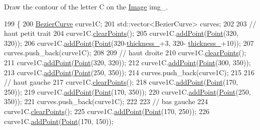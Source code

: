 Draw the contour of the letter C on the \mbox{\hyperlink{class_image}{Image}} img\+\_\+. 


\begin{DoxyCode}
199                \{
200     \mbox{\hyperlink{class_bezier_curve}{BezierCurve}} curve1C;
201     std::vector<BezierCurve> curves;
202 
203     \textcolor{comment}{// haut petit trait}
204     curve1C.\mbox{\hyperlink{class_bezier_curve_a0ba8ce66d5af5971ae6a1b506029728e}{clearPoints}}();
205     curve1C.\mbox{\hyperlink{class_bezier_curve_a38d16c18b36ae45619b05e26e226cf34}{addPoint}}(\mbox{\hyperlink{class_point}{Point}}(320, 320));
206     curve1C.\mbox{\hyperlink{class_bezier_curve_a38d16c18b36ae45619b05e26e226cf34}{addPoint}}(\mbox{\hyperlink{class_point}{Point}}(320-\mbox{\hyperlink{class_font_v1_aed8040e76be9a52833627b92f0fb4e5f}{thickness\_}}+3, 320-
      \mbox{\hyperlink{class_font_v1_aed8040e76be9a52833627b92f0fb4e5f}{thickness\_}}+10));
207     curves.push\_back(curve1C);
208     
209     \textcolor{comment}{// haut droite}
210     curve1C.\mbox{\hyperlink{class_bezier_curve_a0ba8ce66d5af5971ae6a1b506029728e}{clearPoints}}();
211     curve1C.\mbox{\hyperlink{class_bezier_curve_a38d16c18b36ae45619b05e26e226cf34}{addPoint}}(\mbox{\hyperlink{class_point}{Point}}(320, 320));
212     curve1C.\mbox{\hyperlink{class_bezier_curve_a38d16c18b36ae45619b05e26e226cf34}{addPoint}}(\mbox{\hyperlink{class_point}{Point}}(300, 350));
213     curve1C.\mbox{\hyperlink{class_bezier_curve_a38d16c18b36ae45619b05e26e226cf34}{addPoint}}(\mbox{\hyperlink{class_point}{Point}}(250, 350));
214     curves.push\_back(curve1C);
215 
216     \textcolor{comment}{// haut gauche}
217     curve1C.\mbox{\hyperlink{class_bezier_curve_a0ba8ce66d5af5971ae6a1b506029728e}{clearPoints}}();
218     curve1C.\mbox{\hyperlink{class_bezier_curve_a38d16c18b36ae45619b05e26e226cf34}{addPoint}}(\mbox{\hyperlink{class_point}{Point}}(170, 250));
219     curve1C.\mbox{\hyperlink{class_bezier_curve_a38d16c18b36ae45619b05e26e226cf34}{addPoint}}(\mbox{\hyperlink{class_point}{Point}}(170, 350));
220     curve1C.\mbox{\hyperlink{class_bezier_curve_a38d16c18b36ae45619b05e26e226cf34}{addPoint}}(\mbox{\hyperlink{class_point}{Point}}(250, 350));
221     curves.push\_back(curve1C);
222 
223     \textcolor{comment}{// bas gauche}
224     curve1C.\mbox{\hyperlink{class_bezier_curve_a0ba8ce66d5af5971ae6a1b506029728e}{clearPoints}}();
225     curve1C.\mbox{\hyperlink{class_bezier_curve_a38d16c18b36ae45619b05e26e226cf34}{addPoint}}(\mbox{\hyperlink{class_point}{Point}}(170, 250));
226     curve1C.\mbox{\hyperlink{class_bezier_curve_a38d16c18b36ae45619b05e26e226cf34}{addPoint}}(\mbox{\hyperlink{class_point}{Point}}(170, 150));

\end{DoxyCode}
